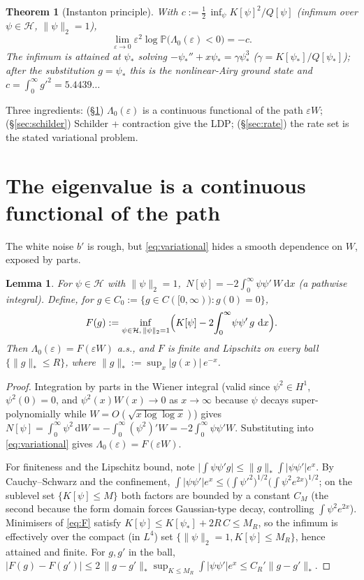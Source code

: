 \documentclass[11pt]{article}
\newtheorem{theorem}{Theorem}
\newtheorem{lemma}{Lemma}
\theoremstyle{remark}
\newcommand{\dd}{\,\mathrm{d}}
\newcommand{\Hform}{\mathcal H}
\newcommand{\Kf}{K}
\newcommand{\Qf}{Q}
\newcommand{\Lam}{\Lambda_0}
\begin{document}
\begin{theorem}[Instanton principle]\label{thm:main}
With $c:=\tfrac12\,\inf_{\psi}\Kf[\psi]^2/\Qf[\psi]$ \emph{(}infimum over
$\psi\in\Hform$, $\|\psi\|_2=1$\emph{)},
\[
  \lim_{\varepsilon\to0}\varepsilon^2\log\mathbb P\bigl(\Lam(\varepsilon)<0\bigr)=-c .
\]
The infimum is attained at $\psi_*$ solving $-\psi_*''+x\psi_*=\gamma\psi_*^3$
\emph{(}$\gamma=\Kf[\psi_*]/\Qf[\psi_*]$\emph{)}; after the substitution $g=\psi_*$ this
is the nonlinear-Airy ground state and $c=\int_0^\infty g'^2=5.4439\ldots$
\end{theorem}

Three ingredients: (\S\ref{sec:cont}) $\Lam(\varepsilon)$ is a continuous functional of
the path $\varepsilon W$; (\S\ref{sec:schilder}) Schilder + contraction give the LDP;
(\S\ref{sec:rate}) the rate set is the stated variational problem.

\section{The eigenvalue is a continuous functional of the path}\label{sec:cont}

The white noise $b'$ is rough, but \eqref{eq:variational} hides a smooth dependence on
$W$, exposed by parts.

\begin{lemma}\label{lem:cont}
For $\psi\in\Hform$ with $\|\psi\|_2=1$,
$\,N[\psi]=-2\int_0^\infty \psi\psi'\,W\dd x$ \emph{(}a pathwise integral\emph{)}. Define,
for $g\in C_0:=\{g\in C([0,\infty)):g(0)=0\}$,
\begin{equation}\label{eq:F}
  F(g):=\inf_{\psi\in\Hform,\,\|\psi\|_2=1}\Bigl(\Kf[\psi]-2\!\int_0^\infty\!\psi\psi'\,g\,\dd x\Bigr).
\end{equation}
Then $\Lam(\varepsilon)=F(\varepsilon W)$ a.s., and $F$ is finite and Lipschitz on every
ball $\{\|g\|_*\le R\}$, where $\|g\|_*:=\sup_x|g(x)|\,e^{-x}$.
\end{lemma}

\begin{proof}
Integration by parts in the Wiener integral (valid since $\psi^2\in H^1$,
$\psi^2(0)=0$, and $\psi^2(x)W(x)\to0$ as $x\to\infty$ because $\psi$ decays
super-polynomially while $W=O(\sqrt{x\log\log x})$) gives
$N[\psi]=\int_0^\infty\psi^2\dd W=-\int_0^\infty(\psi^2)'W=-2\int_0^\infty\psi\psi'W$.
Substituting into \eqref{eq:variational} gives $\Lam(\varepsilon)=F(\varepsilon W)$.

For finiteness and the Lipschitz bound, note $\bigl|\int\psi\psi'g\bigr|
\le\|g\|_*\int|\psi\psi'|e^{x}$. By Cauchy--Schwarz and the confinement,
$\int|\psi\psi'|e^x\le\bigl(\int\psi'^2\bigr)^{1/2}\bigl(\int\psi^2e^{2x}\bigr)^{1/2}$;
on the sublevel set $\{\Kf[\psi]\le M\}$ both factors are bounded by a constant $C_M$
(the second because the form domain forces Gaussian-type decay, controlling
$\int\psi^2 e^{2x}$). Minimisers of \eqref{eq:F} satisfy
$\Kf[\psi]\le \Kf[\psi_*]+2R\,C\le M_R$, so the infimum is effectively over the compact
(in $L^4$) set $\{\|\psi\|_2=1,\Kf[\psi]\le M_R\}$, hence attained and finite. For
$g,g'$ in the ball, $|F(g)-F(g')|\le 2\,\|g-g'\|_*\sup_{\Kf\le M_R}\int|\psi\psi'|e^{x}
\le C_R'\|g-g'\|_*$.
\end{proof}
\end{document}
